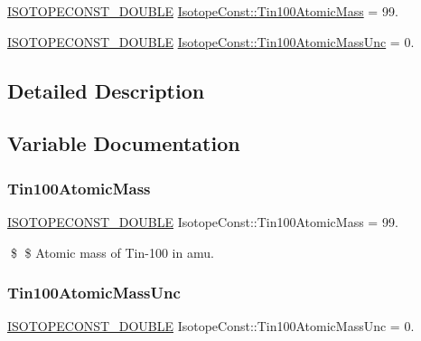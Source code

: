 \begin{DoxyCompactItemize}
\item 
\mbox{\hyperlink{group___isotope_const-_macros_ga8f45a7272ce02c0b4c65c44636ed719a}{I\+S\+O\+T\+O\+P\+E\+C\+O\+N\+S\+T\+\_\+\+D\+O\+U\+B\+LE}} \mbox{\hyperlink{group___isotope_const-_tin-_sn100_ga54e4fc83e6984289f2a2bd044248ab7f}{Isotope\+Const\+::\+Tin100\+Atomic\+Mass}} = 99.
\item 
\mbox{\hyperlink{group___isotope_const-_macros_ga8f45a7272ce02c0b4c65c44636ed719a}{I\+S\+O\+T\+O\+P\+E\+C\+O\+N\+S\+T\+\_\+\+D\+O\+U\+B\+LE}} \mbox{\hyperlink{group___isotope_const-_tin-_sn100_ga4c8a8f53fbe5b6de113ba9cf62311785}{Isotope\+Const\+::\+Tin100\+Atomic\+Mass\+Unc}} = 0.
\end{DoxyCompactItemize}


\subsection{Detailed Description}


\subsection{Variable Documentation}
\mbox{\label{group___isotope_const-_tin-_sn100_ga54e4fc83e6984289f2a2bd044248ab7f}} 
\subsubsection{\texorpdfstring{Tin100\+Atomic\+Mass}{Tin100AtomicMass}}
{\footnotesize\ttfamily \mbox{\hyperlink{group___isotope_const-_macros_ga8f45a7272ce02c0b4c65c44636ed719a}{I\+S\+O\+T\+O\+P\+E\+C\+O\+N\+S\+T\+\_\+\+D\+O\+U\+B\+LE}} Isotope\+Const\+::\+Tin100\+Atomic\+Mass = 99.}

\$ \$ Atomic mass of Tin-\/100 in amu. \mbox{\label{group___isotope_const-_tin-_sn100_ga4c8a8f53fbe5b6de113ba9cf62311785}} 
\subsubsection{\texorpdfstring{Tin100\+Atomic\+Mass\+Unc}{Tin100AtomicMassUnc}}
{\footnotesize\ttfamily \mbox{\hyperlink{group___isotope_const-_macros_ga8f45a7272ce02c0b4c65c44636ed719a}{I\+S\+O\+T\+O\+P\+E\+C\+O\+N\+S\+T\+\_\+\+D\+O\+U\+B\+LE}} Isotope\+Const\+::\+Tin100\+Atomic\+Mass\+Unc = 0.}

